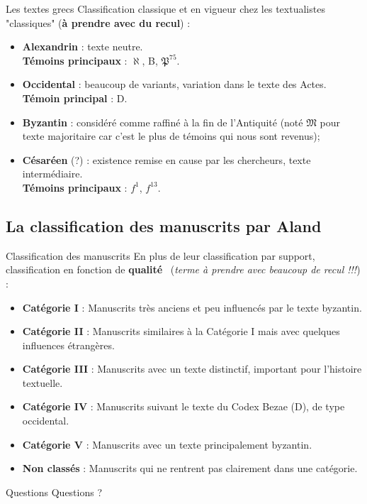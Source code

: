 \documentclass[11pt]{beamer}
\begin{document}
\begin{frame}{Les textes grecs}
    Classification classique et en vigueur chez les textualistes "classiques" (\textbf{à prendre avec du recul}) :

    \begin{itemize}
        \item \textbf{Alexandrin} : texte neutre.\\ \textbf{Témoins principaux} : $\aleph$, B, $\mathfrak{P}^{75}$.
        \item \textbf{Occidental} : beaucoup de variants, variation dans le texte des Actes. \\
        \textbf{Témoin principal} : D.
        \item \textbf{Byzantin} : considéré comme raffiné à la fin de l'Antiquité (noté $\mathfrak{M}$ pour texte majoritaire car c'est le plus de témoins qui nous sont revenus);
        \item \textbf{Césaréen} (?) : existence remise en cause par les chercheurs, texte intermédiaire. \\
        \textbf{Témoins principaux} : $f^1$, $f^{13}$.
    \end{itemize}
\end{frame}

\subsection{La classification des manuscrits par Aland}

\begin{frame}{Classification des manuscrits}
En plus de leur classification par support, classification en fonction de \og \textbf{qualité} \fg\ (\textit{terme à prendre avec beaucoup de recul !!!}) :
\pause
\begin{itemize}
\item \textbf{Catégorie I} : Manuscrits très anciens et peu influencés par le texte byzantin.
\pause

\item \textbf{Catégorie II} : Manuscrits similaires à la Catégorie I mais avec quelques influences étrangères.
\pause

\item \textbf{Catégorie III} : Manuscrits avec un texte distinctif, important pour l'histoire textuelle.
\pause

\item \textbf{Catégorie IV} : Manuscrits suivant le texte du Codex Bezae (D), de type occidental.
\pause

\item \textbf{Catégorie V} : Manuscrits avec un texte principalement byzantin.
\pause

\item \textbf{Non classés} : Manuscrits qui ne rentrent pas clairement dans une catégorie.
\end{itemize}
\end{frame}

\begin{frame}{Questions}
    Questions ?
\end{frame}
\end{document}
